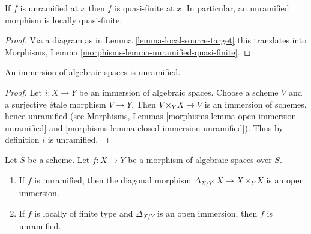 \begin{lemma}
\label{lemma-unramified-quasi-finite}
If $f$ is unramified at $x$ then $f$ is quasi-finite at $x$.
In particular, an unramified morphism is locally quasi-finite.
\end{lemma}

\begin{proof}
Via a diagram as in
Lemma \ref{lemma-local-source-target}
this translates into
Morphisms, Lemma \ref{morphisms-lemma-unramified-quasi-finite}.
\end{proof}

\begin{lemma}
\label{lemma-immersion-unramified}
An immersion of algebraic spaces is unramified.
\end{lemma}

\begin{proof}
Let $i : X \to Y$ be an immersion of algebraic spaces. Choose a scheme
$V$ and a surjective \'etale morphism $V \to Y$. Then $V \times_Y X \to V$
is an immersion of schemes, hence unramified (see
Morphisms, Lemmas \ref{morphisms-lemma-open-immersion-unramified} and
\ref{morphisms-lemma-closed-immersion-unramified}).
Thus by definition $i$ is unramified.
\end{proof}

\begin{lemma}
\label{lemma-diagonal-unramified-morphism}
Let $S$ be a scheme.
Let $f : X \to Y$ be a morphism of algebraic spaces over $S$.
\begin{enumerate}
\item If $f$ is unramified, then the diagonal morphism
$\Delta_{X/Y} : X \to X \times_Y X$ is an open immersion.
\item If $f$ is locally of finite type
and $\Delta_{X/Y}$ is an open immersion, then $f$ is unramified.
\end{enumerate}
\end{lemma}


